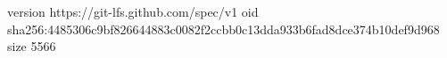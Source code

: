 version https://git-lfs.github.com/spec/v1
oid sha256:4485306c9bf826644883c0082f2ccbb0c13dda933b6fad8dce374b10def9d968
size 5566

